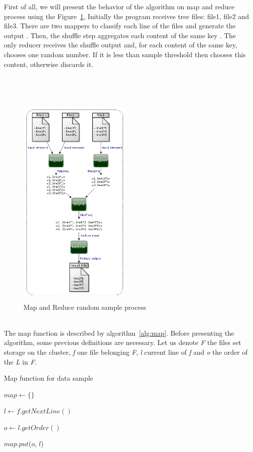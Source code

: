 First of all, we will present the behavior of the algorithm on map and reduce process
using the Figure~\ref{fig:sampleProcess}, Initially the program receives tree files:
file1, file2 and file3. There are two mappers to classify each line of the files
and generate the output . Then, the shuffle step
aggregates each content of the same key .
The only reducer receives the shuffle output and, for each content of the same key,
chooses one random number. If it is less than sample threshold then chooses this
content, otherwise discards it.
\\
\\
\\
\\
\begin{figure}[htbp]
	\centering
	\includegraphics[width=210px,height=400px]{img/sampleProcess.png}
	\caption{Map and Reduce random sample process}\label{fig:sampleProcess}
\end{figure}
\\

The map function is described by algorithm~\ref{alg:map}. Before presenting the
algorithm, some previous definitions are necessary. Let us denote {\it F} the files
set storage on the cluster, {\it f} one file belonging {\it F}, {\it l} current
line of {\it f} and {\it o} the order of the {\it L} in {\it F}.

\begin{algorithm}
		\caption{Map function for data sample \label{alg:map}}


		$map \leftarrow  \{\}$

		 {

			$l \leftarrow f.getNextLine()$

	    	$o \leftarrow l.getOrder()$ 

			$map.put$($o$, $l$)

		}

\end{algorithm}


